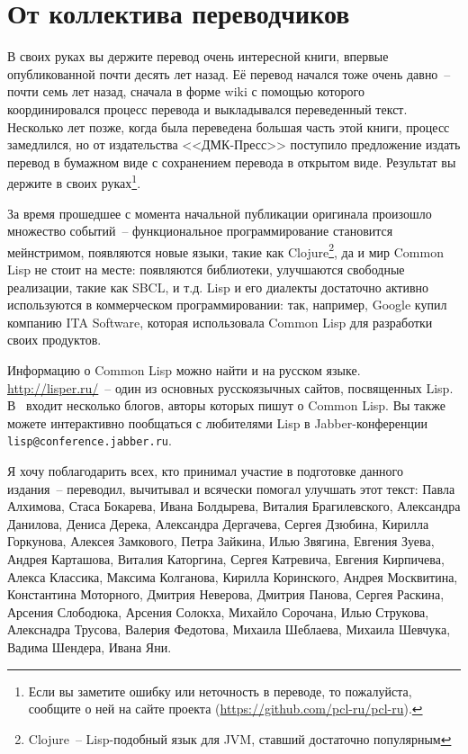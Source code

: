 \chapter*{От коллектива переводчиков}

В своих руках вы держите перевод очень интересной книги, впервые опубликованной почти
десять лет назад.  Её перевод начался тоже очень давно~-- почти семь лет назад, сначала в
форме wiki с помощью которого координировался процесс перевода и выкладывался переведенный
текст.  Несколько лет позже, когда была переведена большая часть этой книги, процесс
замедлился, но от издательства <<ДМК-Пресс>> поступило предложение издать перевод в
бумажном виде с сохранением перевода в открытом виде.  Результат вы держите в своих
руках\footnote{Если вы заметите ошибку или неточность в переводе, то пожалуйста, сообщите
  о ней на сайте проекта (\url{https://github.com/pcl-ru/pcl-ru}).}\hspace{\footnotenegspace}.

За время прошедшее с момента начальной публикации оригинала произошло множество событий~--
функциональное программирование становится мейнстримом, появляются новые языки, такие как
Clojure\footnote{Clojure~-- Lisp-подобный язык для JVM, ставший достаточно популярным}, да
и мир Common Lisp не стоит на месте: появляются библиотеки, улучшаются свободные
реализации, такие как SBCL, и т.д.  Lisp и его диалекты достаточно активно используются в
коммерческом программировании: так, например, Google купил компанию ITA Software, которая
использовала Common Lisp для разработки своих продуктов.

Информацию о Common Lisp можно найти и на русском языке.
\mbox{\url{http://lisper.ru/}}~-- один из основных русскоязычных сайтов, посвященных Lisp.
В~
входит несколько блогов, авторы которых пишут о Common Lisp.  Вы также можете интерактивно
пообщаться с любителями Lisp в Jabber-конференции \verb|lisp@conference.jabber.ru|.

Я хочу поблагодарить всех, кто принимал участие в подготовке данного издания~-- переводил,
вычитывал и всячески помогал улучшать этот текст: Павла Алхимова, Стаса Бокарева, Ивана
Болдырева, Виталия Брагилевского, Александра Данилова, Дениса Дерека, Александра
Дергачева, Сергея Дзюбина, Кирилла Горкунова, Алексея Замкового, Петра Зайкина, Илью
Звягина, Евгения Зуева, Андрея Карташова, Виталия Каторгина, Сергея Катревича, Евгения
Кирпичева, Алекса Классика, Максима Колганова, Кирилла Коринского, Андрея Москвитина,
Константина Моторного, Дмитрия Неверова, Дмитрия Панова, Сергея Раскина, Арсения
Слободюка, Арсения Солокха, Михайло Сорочана, Илью Струкова, Алекснадра Трусова, Валерия
Федотова, Михаила Шеблаева, Михаила Шевчука, Вадима Шендера, Ивана Яни.

